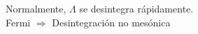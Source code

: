 \documentclass[preview]{standalone}
\begin{document}
\begin{center}
Normalmente, $\Lambda$ se desintegra rápidamente.\\
                     Fermi $\Rightarrow$ Desintegración no mesónica
\end{center}
\end{document}
